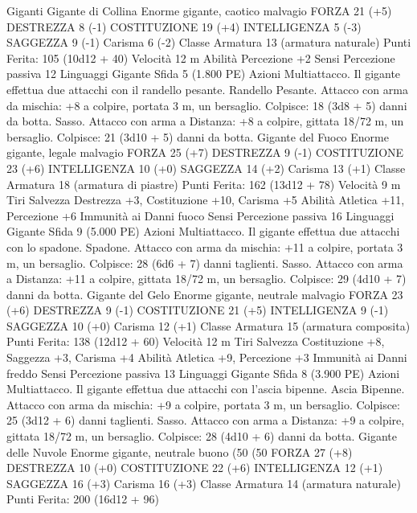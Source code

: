 \begin{multicols}{2}
Giganti
Gigante di Collina
Enorme gigante, caotico malvagio
FORZA 21 (+5)
DESTREZZA 8 (-1)
COSTITUZIONE 19 (+4)
INTELLIGENZA 5 (-3)
SAGGEZZA 9 (-1)
Carisma 6 (-2)
Classe Armatura 13 (armatura naturale)
\hspace*{0pt}\hfill{Punti Ferita}: 105 (10d12 + 40)
Velocità 12 m
Abilità Percezione +2
Sensi Percezione passiva 12
Linguaggi Gigante
Sfida 5 (1.800 PE)
Azioni
Multiattacco. Il gigante effettua due attacchi con il randello pesante.
Randello Pesante. Attacco con arma da mischia: +8 a colpire,
portata 3 m, un bersaglio.
Colpisce: 18 (3d8 + 5) danni da botta.
Sasso. Attacco con arma a Distanza: +8 a colpire, gittata 18/72
m, un bersaglio.
Colpisce: 21 (3d10 + 5) danni da botta.
Gigante del Fuoco
Enorme gigante, legale malvagio
FORZA 25 (+7)
DESTREZZA 9 (-1)
COSTITUZIONE 23 (+6)
INTELLIGENZA 10 (+0)
SAGGEZZA 14 (+2)
Carisma 13 (+1)
Classe Armatura 18 (armatura di piastre)
\hspace*{0pt}\hfill{Punti Ferita}: 162 (13d12 + 78)
Velocità 9 m
Tiri Salvezza Destrezza +3, Costituzione +10, Carisma +5
Abilità Atletica +11, Percezione +6
Immunità ai Danni fuoco
Sensi Percezione passiva 16
Linguaggi Gigante
Sfida 9 (5.000 PE)
Azioni
Multiattacco. Il gigante effettua due attacchi con lo spadone.
Spadone. Attacco con arma da mischia: +11 a colpire, portata 3
m, un bersaglio.
Colpisce: 28 (6d6 + 7) danni taglienti.
Sasso. Attacco con arma a Distanza: +11 a colpire, gittata 18/72
m, un bersaglio.
Colpisce: 29 (4d10 + 7) danni da botta.
Gigante del Gelo
Enorme gigante, neutrale malvagio
FORZA 23 (+6)
DESTREZZA 9 (-1)
COSTITUZIONE 21 (+5)
INTELLIGENZA 9 (-1)
SAGGEZZA 10 (+0)
Carisma 12 (+1)
Classe Armatura 15 (armatura composita)
\hspace*{0pt}\hfill{Punti Ferita}: 138 (12d12 + 60)
Velocità 12 m
Tiri Salvezza Costituzione +8, Saggezza +3, Carisma +4
Abilità Atletica +9, Percezione +3
Immunità ai Danni freddo
Sensi Percezione passiva 13
Linguaggi Gigante
Sfida 8 (3.900 PE)
Azioni
Multiattacco. Il gigante effettua due attacchi con l’ascia bipenne.
Ascia Bipenne. Attacco con arma da mischia: +9 a colpire,
portata 3 m, un bersaglio.
Colpisce: 25 (3d12 + 6) danni taglienti.
Sasso. Attacco con arma a Distanza: +9 a colpire, gittata 18/72
m, un bersaglio.
Colpisce: 28 (4d10 + 6) danni da botta.
Gigante delle Nuvole
Enorme gigante, neutrale buono (50%
(50%
FORZA 27 (+8)
DESTREZZA 10 (+0)
COSTITUZIONE 22 (+6)
INTELLIGENZA 12 (+1)
SAGGEZZA 16 (+3)
Carisma 16 (+3)
Classe Armatura 14 (armatura naturale)
\hspace*{0pt}\hfill{Punti Ferita}: 200 (16d12 + 96)

\end{multicols}
